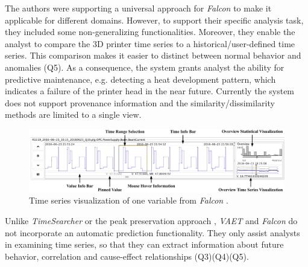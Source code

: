 \documentclass[electronic]{vgtc}             %
\begin{document}
The authors were supporting a universal approach for \textit{Falcon}  to make it applicable for different domains. 
However, to support their specific analysis task, they included some non-generalizing functionalities. 
Moreover, they enable the analyst to compare the 3D printer time series to a historical/user-defined time series. 
This comparison makes it easier to distinct between normal behavior and anomalies (Q5). 
As a consequence, the system grants analyst the ability for predictive maintenance, e.g. detecting a heat development pattern, which indicates a failure of the printer head in the near future. 
Currently the system does not support provenance information and the similarity/dissimilarity methods are limited to a single view.

\begin{figure}[t]
	\centering
	\includegraphics[width=\columnwidth]{Falcon}
	\caption{Time series visualization of one variable from \textit{Falcon}  \cite{steed:2017}.
	}
	\label{fig:falcon}
\end{figure}

Unlike \textit{TimeSearcher} \cite{buono:2007} or the peak preservation approach \cite{Hao:2012}, \textit{VAET} \cite{Xie:2014} and \textit{Falcon}  \cite{steed:2017} do not incorporate an automatic prediction functionality.
They only assist analysts in examining time series, so that they can extract information about future behavior, correlation and cause-effect relationships  (Q3)(Q4)(Q5). 
\end{document}
